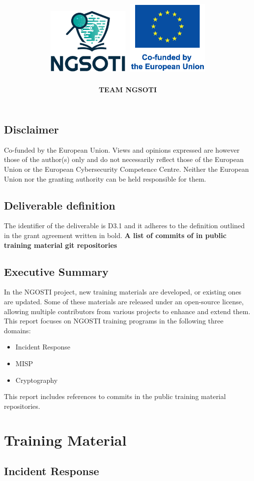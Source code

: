 \documentclass[10pt,a4paper]{report}
\title{
    \Huge \textbf{\delivtitle} \\[0.5cm]
    \includegraphics[width=0.3\textwidth]{img/ngsoti.eps}
    \hspace{1cm}
    \includegraphics[width=0.3\textwidth]{img/eu_funded_en.eps}
}
\author{\textbf{TEAM NGSOTI}}
\date{\delivdate}
\begin{document}
\maketitle
\thispagestyle{empty} %

\newpage
\tableofcontents
\newpage
\section*{Disclaimer}
Co-funded by the European Union. Views and opinions expressed are however those of the author(s) only
and do not necessarily reflect those of the European Union or the European Cybersecurity Competence Centre. Neither
the European Union nor the granting authority can be held responsible for them.

\section*{Deliverable definition}
The identifier of the deliverable is D3.1 and it adheres to the definition outlined in the grant agreement
written in bold. \textbf{A list of commits of in public training material git repositories}

\section*{Executive Summary}
In the NGOSTI project, new training materials are developed, or existing ones
are updated. Some of these materials are released under an open-source license,
allowing multiple contributors from various projects to enhance and extend them.
This report focuses on NGOSTI training programs in the following three domains:

\begin{itemize}
    \item Incident Response
    \item MISP
    \item Cryptography
\end{itemize}

This report includes references to commits in the public training material
repositories.

\chapter{Training Material}

\section{Incident Response}
\end{document}
